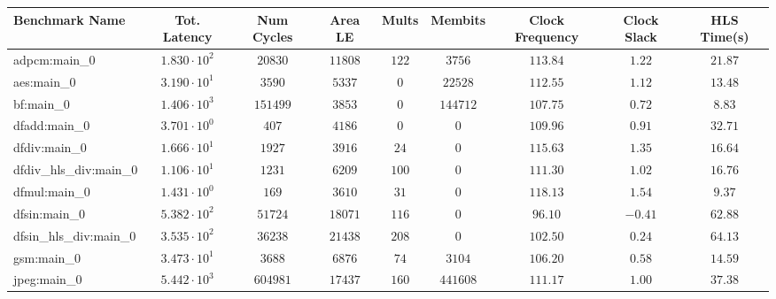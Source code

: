 \begin{tabular}{|l|c|c|c|c|c|c|c|c|}
\hline
Benchmark Name          & Tot. Latency           & Num Cycles  & Area LE    & Mults   & Membits    & Clock Frequency & Clock Slack & HLS Time(s) \\
\hline
adpcm:main\_0           & $ 1.830 \cdot 10^{2} $ & $ 20830   $ & $ 11808  $ & $ 122 $ & $ 3756   $ & $ 113.84      $ & $ 1.22    $ & $ 21.87   $ \\
aes:main\_0             & $ 3.190 \cdot 10^{1} $ & $ 3590    $ & $ 5337   $ & $ 0   $ & $ 22528  $ & $ 112.55      $ & $ 1.12    $ & $ 13.48   $ \\
bf:main\_0              & $ 1.406 \cdot 10^{3} $ & $ 151499  $ & $ 3853   $ & $ 0   $ & $ 144712 $ & $ 107.75      $ & $ 0.72    $ & $ 8.83    $ \\
dfadd:main\_0           & $ 3.701 \cdot 10^{0} $ & $ 407     $ & $ 4186   $ & $ 0   $ & $ 0      $ & $ 109.96      $ & $ 0.91    $ & $ 32.71   $ \\
dfdiv:main\_0           & $ 1.666 \cdot 10^{1} $ & $ 1927    $ & $ 3916   $ & $ 24  $ & $ 0      $ & $ 115.63      $ & $ 1.35    $ & $ 16.64   $ \\
dfdiv\_hls\_div:main\_0 & $ 1.106 \cdot 10^{1} $ & $ 1231    $ & $ 6209   $ & $ 100 $ & $ 0      $ & $ 111.30      $ & $ 1.02    $ & $ 16.76   $ \\
dfmul:main\_0           & $ 1.431 \cdot 10^{0} $ & $ 169     $ & $ 3610   $ & $ 31  $ & $ 0      $ & $ 118.13      $ & $ 1.54    $ & $ 9.37    $ \\
dfsin:main\_0           & $ 5.382 \cdot 10^{2} $ & $ 51724   $ & $ 18071  $ & $ 116 $ & $ 0      $ & $ 96.10       $ & $ -0.41   $ & $ 62.88   $ \\
dfsin\_hls\_div:main\_0 & $ 3.535 \cdot 10^{2} $ & $ 36238   $ & $ 21438  $ & $ 208 $ & $ 0      $ & $ 102.50      $ & $ 0.24    $ & $ 64.13   $ \\
gsm:main\_0             & $ 3.473 \cdot 10^{1} $ & $ 3688    $ & $ 6876   $ & $ 74  $ & $ 3104   $ & $ 106.20      $ & $ 0.58    $ & $ 14.59   $ \\
jpeg:main\_0            & $ 5.442 \cdot 10^{3} $ & $ 604981  $ & $ 17437  $ & $ 160 $ & $ 441608 $ & $ 111.17      $ & $ 1.00    $ & $ 37.38   $ \\

\end{tabular}
